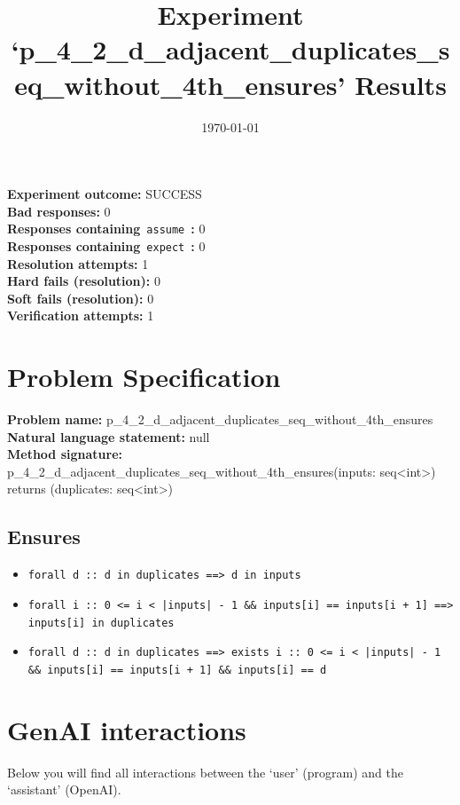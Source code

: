 \documentclass{article}
\begin{document}
\title{Experiment `p\_4\_2\_d\_adjacent\_duplicates\_seq\_without\_4th\_ensures' Results}
\author{\today}
\date{}
\maketitle
\textbf{Experiment outcome: }SUCCESS
\\\textbf{Bad responses: }0
\\\textbf{Responses containing}~\texttt{assume}~\textbf{: }0
\\\textbf{Responses containing}~\texttt{expect}~\textbf{: }0
\\\textbf{Resolution attempts: }1
\\\textbf{Hard fails (resolution): }0
\\\textbf{Soft fails (resolution): }0
\\\textbf{Verification attempts: }1
\section*{Problem Specification}
\textbf{Problem name: }p\_4\_2\_d\_adjacent\_duplicates\_seq\_without\_4th\_ensures
\\\textbf{Natural language statement: }null
\\\textbf{Method signature: }p\_4\_2\_d\_adjacent\_duplicates\_seq\_without\_4th\_ensures(inputs: seq<int>) returns (duplicates: seq<int>)
\subsection*{Ensures}
\begin{itemize}
\item \texttt{forall d :: d in duplicates ==> d in inputs}
\item \texttt{forall i :: 0 <= i < |inputs| - 1 \&\& inputs[i] == inputs[i + 1] ==> inputs[i] in duplicates}
\item \texttt{forall d :: d in duplicates ==> exists i :: 0 <= i < |inputs| - 1 \&\& inputs[i] == inputs[i + 1] \&\& inputs[i] == d}
\end{itemize}
\clearpage
\section*{GenAI interactions}
Below you will find all interactions between the `user' (program) and the `assistant' (OpenAI).
\end{document}
